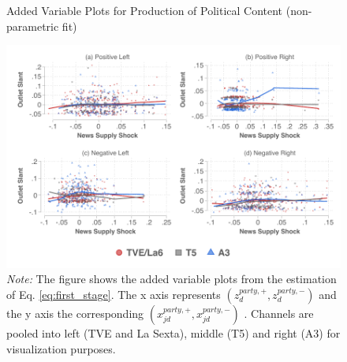 \documentclass[12pt]{article}
\begin{document}
		\begin{figure}[ht!]
		\centering
		\caption{Added Variable Plots for Production of Political Content (non-parametric fit)}
		\includegraphics[width=160mm]{figures/fwl_plots_lowess_v2}
		\caption*{\small \textit{Note:} The figure shows the added variable plots from the estimation of Eq. \eqref{eq:first_stage}. The x axis represents $(z_d^{party,+},z_d^{party,-}) $ and the y axis the corresponding  $(x_{jd}^{party,+},x_{jd}^{party,-}) $   . Channels are pooled into left (TVE and La Sexta), middle (T5) and right (A3) for visualization purposes.  }
		\label{fig:fwl_lowess}
	\end{figure}
	
\end{document}
